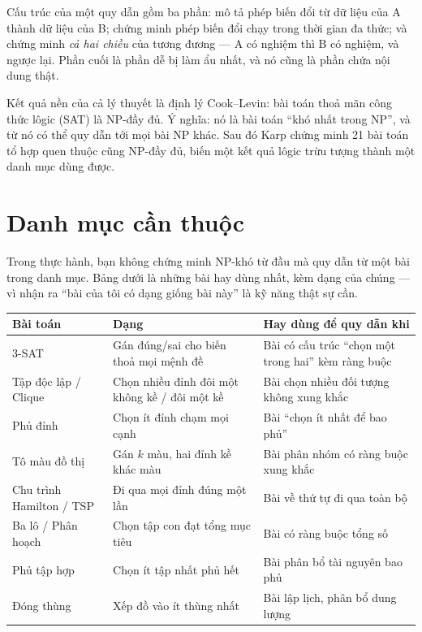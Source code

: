 \documentclass[../../algorithm.tex]{subfiles}
\begin{document}
Cấu trúc của một quy dẫn gồm ba phần: mô tả phép biến đổi từ dữ liệu của A thành dữ liệu của B; chứng minh phép biến đổi chạy trong thời gian đa thức; và chứng minh \emph{cả hai chiều} của tương đương --- A có nghiệm thì B có nghiệm, và ngược lại. Phần cuối là phần dễ bị làm ẩu nhất, và nó cũng là phần chứa nội dung thật.

Kết quả nền của cả lý thuyết là định lý Cook--Levin: bài toán thoả mãn công thức lôgic (SAT) là NP-đầy đủ. Ý nghĩa: nó là bài toán ``khó nhất trong NP'', và từ nó có thể quy dẫn tới mọi bài NP khác. Sau đó Karp chứng minh 21 bài toán tổ hợp quen thuộc cũng NP-đầy đủ, biến một kết quả lôgic trừu tượng thành một danh mục dùng được.

\section{Danh mục cần thuộc}

Trong thực hành, bạn không chứng minh NP-khó từ đầu mà quy dẫn từ một bài trong danh mục. Bảng dưới là những bài hay dùng nhất, kèm dạng của chúng --- vì nhận ra ``bài của tôi có dạng giống bài này'' là kỹ năng thật sự cần.

\begin{center}\footnotesize
\begin{tabularx}{\linewidth}{@{}L{3.6cm}L{4.2cm}Y@{}}
\toprule
\textbf{Bài toán} & \textbf{Dạng} & \textbf{Hay dùng để quy dẫn khi}\\
-SAT & Gán đúng/sai cho biến thoả mọi mệnh đề & Bài có cấu trúc ``chọn một trong hai'' kèm ràng buộc\\
Tập độc lập / Clique & Chọn nhiều đỉnh đôi một không kề / đôi một kề & Bài chọn nhiều đối tượng không xung khắc\\
Phủ đỉnh & Chọn ít đỉnh chạm mọi cạnh & Bài ``chọn ít nhất để bao phủ''\\
Tô màu đồ thị & Gán \(k\) màu, hai đỉnh kề khác màu & Bài phân nhóm có ràng buộc xung khắc\\
Chu trình Hamilton / TSP & Đi qua mọi đỉnh đúng một lần & Bài về thứ tự đi qua toàn bộ\\
Ba lô / Phân hoạch & Chọn tập con đạt tổng mục tiêu & Bài có ràng buộc tổng số\\
Phủ tập hợp & Chọn ít tập nhất phủ hết & Bài phân bổ tài nguyên bao phủ\\
Đóng thùng & Xếp đồ vào ít thùng nhất & Bài lập lịch, phân bổ dung lượng\\
\bottomrule
\end{tabularx}
\end{center}
\end{document}
